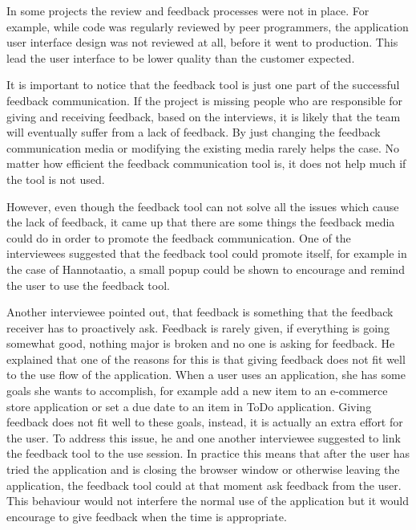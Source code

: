 \documentclass[english,12pt,a4paper,pdftex]{article}
\begin{document}
In some projects the review and feedback processes were not in place. For example, while code was regularly reviewed by peer programmers, the application user interface design was not reviewed at all, before it went to production. This lead the user interface to be lower quality than the customer expected.

It is important to notice that the feedback tool is just one part of the successful feedback communication. If the project is missing people who are responsible for giving and receiving feedback, based on the interviews, it is likely that the team will eventually suffer from a lack of feedback. By just changing the feedback communication media or modifying the existing media rarely helps the case. No matter how efficient the feedback communication tool is, it does not help much if the tool is not used.

However, even though the feedback tool can not solve all the issues which cause the lack of feedback, it came up that there are some things the feedback media could do in order to promote the feedback communication. One of the interviewees suggested that the feedback tool could promote itself, for example in the case of Hannotaatio, a small popup could be shown to encourage and remind the user to use the feedback tool. 

Another interviewee pointed out, that feedback is something that the feedback receiver has to proactively ask. Feedback is rarely given, if everything is going somewhat good, nothing major is broken and no one is asking for feedback. He explained that one of the reasons for this is that giving feedback does not fit well to the use flow of the application. When a user uses an application, she has some goals she wants to accomplish, for example add a new item to an e-commerce store application or set a due date to an item in ToDo application. Giving feedback does not fit well to these goals, instead, it is actually an extra effort for the user. To address this issue, he and one another interviewee suggested to link the feedback tool to the use session. In practice this means that after the user has tried the application and is closing the browser window or otherwise leaving the application, the feedback tool could at that moment ask feedback from the user. This behaviour would not interfere the normal use of the application but it would encourage to give feedback when the time is appropriate. 

\end{document}
